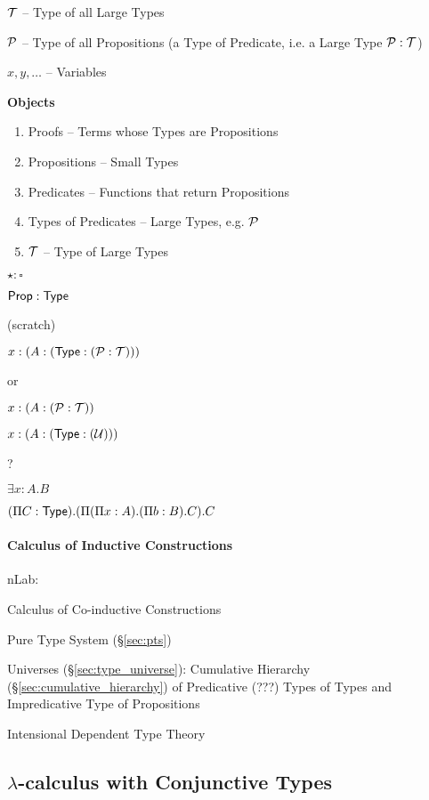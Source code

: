 $\mathcal{T}$ -- Type of all Large Types

$\mathcal{P}$ -- Type of all Propositions (a Type of Predicate, i.e. a
Large Type $\mathcal{P}:\mathcal{T}$)

$x,y,\ldots$ -- Variables


\textbf{Objects}

\begin{enumerate}
  \item Proofs -- Terms whose Types are Propositions
  \item Propositions -- Small Types
  \item Predicates -- Functions that return Propositions
  \item Types of Predicates -- Large Types, e.g. $\mathcal{P}$
  \item $\mathcal{T}$ -- Type of Large Types
\end{enumerate}

$\star:\square$

$\mathsf{Prop}:\mathsf{Type}$


\asterism


(scratch)

$x:(A:(\mathsf{Type}:(\mathcal{P}:\mathcal{T})))$

or

$x:(A:(\mathcal{P}:\mathcal{T}))$

$x:(A:(\mathsf{Type}:(\mathcal{U})))$

?


$\exists x:A.B$

$(\Pi C:\mathsf{Type}).(\Pi (\Pi x:A).(\Pi b:B).C).C$



\paragraph{Calculus of Inductive Constructions}\label{sec:cic}

nLab:

Calculus of Co-inductive Constructions

Pure Type System (\S\ref{sec:pts})

Universes (\S\ref{sec:type_universe}): Cumulative Hierarchy
(\S\ref{sec:cumulative_hierarchy}) of Predicative (???) Types of Types
and Impredicative Type of Propositions %

Intensional Dependent Type Theory



\subsection{$\lambda$-calculus with Conjunctive Types}
\label{sec:conjunctive_lambda}


